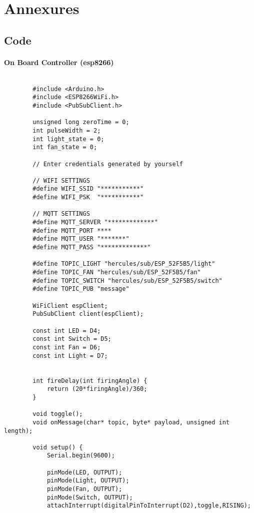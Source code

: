 \chapter{Annexures}
        \section{Code}
        
        \subsubsection{On Board Controller (esp8266)}
        
        \begin{lstlisting}
        
        #include <Arduino.h>
        #include <ESP8266WiFi.h>
        #include <PubSubClient.h>
        
        unsigned long zeroTime = 0;
        int pulseWidth = 2;
        int light_state = 0;
        int fan_state = 0;
        
        // Enter credentials generated by yourself
        
        // WIFI SETTINGS
        #define WIFI_SSID "***********" 
        #define WIFI_PSK  "***********" 
        
        // MQTT SETTINGS
        #define MQTT_SERVER "*************"
        #define MQTT_PORT ****
        #define MQTT_USER "*******"
        #define MQTT_PASS "*************"
        
        #define TOPIC_LIGHT "hercules/sub/ESP_52F5B5/light"
        #define TOPIC_FAN "hercules/sub/ESP_52F5B5/fan"
        #define TOPIC_SWITCH "hercules/sub/ESP_52F5B5/switch"
        #define TOPIC_PUB "message"
        
        WiFiClient espClient;
        PubSubClient client(espClient);
        
        const int LED = D4;
        const int Switch = D5;
        const int Fan = D6;
        const int Light = D7;
        
        
        int fireDelay(int firingAngle) { 
        	return (20*firingAngle)/360;
        }
        
        void toggle();
        void onMessage(char* topic, byte* payload, unsigned int length);
        
        void setup() {
	        Serial.begin(9600);
	        
	        pinMode(LED, OUTPUT);
	        pinMode(Light, OUTPUT);
	        pinMode(Fan, OUTPUT);
	        pinMode(Switch, OUTPUT);
	        attachInterrupt(digitalPinToInterrupt(D2),toggle,RISING);
	        

\end{lstlisting}
